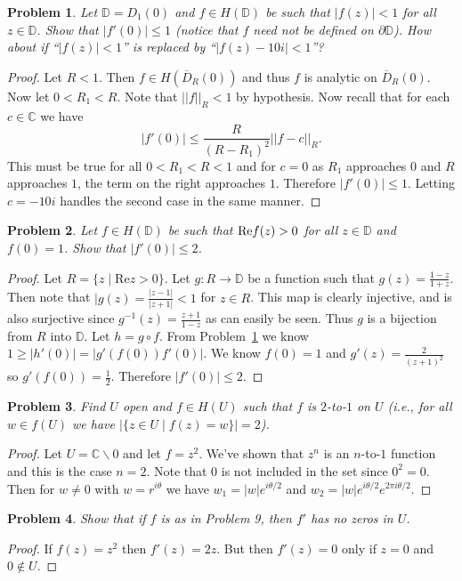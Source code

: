 \documentclass{article}
\newtheorem{problem}{Problem}
\begin{document}
\begin{problem}
\label{disk}
Let $\mathbb{D} = D_1(0)$ and $f \in H(\mathbb{D})$ be such that $|f(z)| < 1$ for all $z \in \mathbb{D}$. Show that $|f'(0)| \leq 1$ (notice that $f$ need not be defined on $\partial \mathbb{D}$). How about if ``$|f(z)| < 1$'' is replaced by ``$|f(z) - 10i| < 1$''?
\end{problem}
\begin{proof}
Let $R < 1$. Then $f \in H(\overline{D}_R(0))$ and thus $f$ is analytic on $\overline{D}_R(0)$. Now let $0 < R_1 < R$. Note that $||f||_R < 1$ by hypothesis. Now recall that for each $c \in \mathbb{C}$ we have
\[
|f'(0)| \leq \frac{R}{(R-R_1)^2} ||f-c||_R.
\]
This must be true for all $0 < R_1 < R < 1$ and for $c = 0$ as $R_1$ approaches $0$ and $R$ approaches $1$, the term on the right approaches $1$. Therefore $|f'(0)| \leq 1$. Letting $c = -10i$ handles the second case in the same manner.
\end{proof}

\begin{problem}
Let $f \in H(\mathbb{D})$ be such that $\textup{Re}f(z) > 0$ for all $z \in \mathbb{D}$ and $f(0) = 1$. Show that $|f'(0)| \leq 2$.
\end{problem}
\begin{proof}
Let $R = \{z \mid \text{Re}z > 0\}$. Let $g : R \rightarrow \mathbb{D}$ be a function such that $g(z) = \frac{1-z}{1+z}$. Then note that $|g(z) = \frac{|z-1|}{|z+1|} < 1$ for $z \in R$. This map is clearly injective, and is also surjective since $g^{-1}(z) = \frac{z+1}{1-z}$ as can easily be seen. Thus $g$ is a bijection from $R$ into $\mathbb{D}$. Let $h = g \circ f$. From Problem~\ref{disk} we know $1 \geq |h'(0)| = |g'(f(0))f'(0)|$. We know $f(0) = 1$ and $g'(z) = \frac{2}{(z+1)^2}$ so $g'(f(0)) = \frac{1}{2}$. Therefore $|f'(0)| \leq 2$.
\end{proof}

\begin{problem}
Find $U$ open and $f \in H(U)$ such that $f$ is $2$-to-$1$ on $U$ (i.e., for all $w \in f(U)$ we have $|\{z \in U \mid f(z) = w\}| = 2$).
\end{problem}
\begin{proof}
Let $U = \mathbb{C} \backslash 0$ and let $f = z^2$. We've shown that $z^n$ is an $n$-to-$1$ function and this is the case $n=2$. Note that $0$ is not included in the set since $0^2 = 0$. Then for $w \neq 0$ with $w = r^{i\theta}$ we have $w_1 = |w|e^{i\theta/2}$ and $w_2 = |w|e^{i\theta/2} e^{2 \pi i \theta/2}$.
\end{proof}

\begin{problem}
Show that if $f$ is as in Problem 9, then $f'$ has no zeros in $U$.
\end{problem}
\begin{proof}
If $f(z) = z^2$ then $f'(z) = 2z$. But then $f'(z) = 0$ only if $z = 0$ and $0 \notin U$.
\end{proof}
\end{document}
